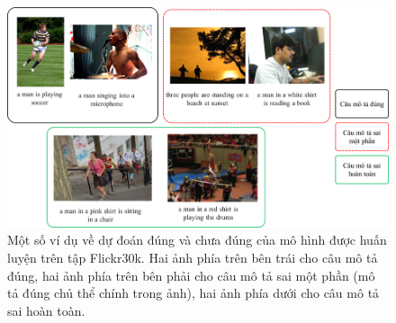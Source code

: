 \documentclass[conference]{IEEEtran}
\begin{document}
\begin{figure}[h]
\includegraphics[width=\textwidth]{assets/predict.png}
  \caption{Một số ví dụ về dự đoán đúng và chưa đúng của mô hình được huấn luyện trên tập Flickr30k. Hai ảnh phía trên bên trái cho câu mô tả đúng, hai ảnh phía trên bên phải cho câu mô tả sai một phần (mô tả đúng chủ thể chính trong ảnh), hai ảnh phía dưới cho câu mô tả sai hoàn toàn. }
  \label{fig:predict}
\end{figure}
\end{document}
